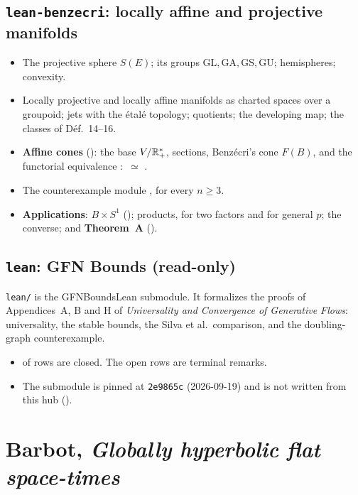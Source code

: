 \subsection{\texttt{lean-benzecri}: locally affine and projective manifolds}

\begin{itemize}
\item The projective sphere $S(E)$; its groups $\mathrm{GL},\mathrm{GA},\mathrm{GS},\mathrm{GU}$;
  hemispheres; convexity.
\item Locally projective and locally affine manifolds as charted spaces over a groupoid; jets
  with the étalé topology; quotients; the developing map; the classes of Déf.~14--16.
\item \textbf{Affine cones} (): the base $V/\mathbb{R}_+^*$, sections, Benzécri's
  cone $F(B)$, and the functorial equivalence
  ${}:{}$  $\simeq$ .
\item The counterexample module , for every $n\ge3$.
\item \textbf{Applications}: $B\times S^1$ (); products, for two factors
  and for general $p$; the converse; and \textbf{Theorem~A} ().
\end{itemize}

\subsection{\texttt{lean}: GFN Bounds (read-only)}

\texttt{lean/} is the GFNBoundsLean submodule. It formalizes the proofs of Appendices~A, B and H
of \emph{Universality and Convergence of Generative Flows}: universality, the stable bounds, the
Silva et al.\ comparison, and the doubling-graph counterexample.
\begin{itemize}
\item \numGfnClosed{} of \numGfnStatements{} rows are closed. The \numGfnOpen{} open rows are
  terminal remarks.
\item The submodule is pinned at \texttt{2e9865c} (2026-09-19) and is not written from this
  hub ().
\end{itemize}

\section{Barbot, \emph{Globally hyperbolic flat space-times}}\label{sec:barbot}

